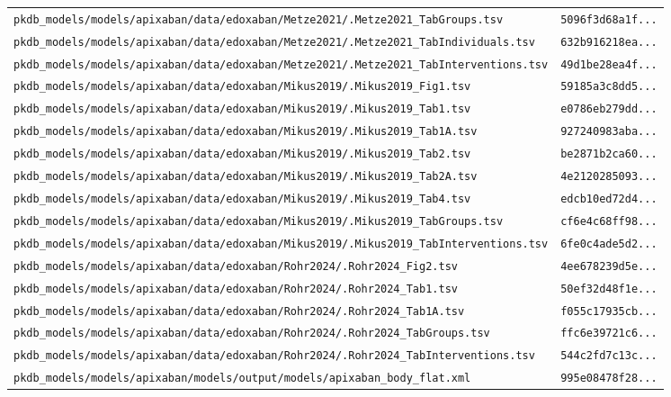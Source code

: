 \documentclass{article}
\begin{document}
\begin{longtable}{ll}
\texttt{pkdb\_models/models/apixaban/data/edoxaban/Metze2021/.Metze2021\_TabGroups.tsv} & \texttt{5096f3d68a1f...} \\
\texttt{pkdb\_models/models/apixaban/data/edoxaban/Metze2021/.Metze2021\_TabIndividuals.tsv} & \texttt{632b916218ea...} \\
\texttt{pkdb\_models/models/apixaban/data/edoxaban/Metze2021/.Metze2021\_TabInterventions.tsv} & \texttt{49d1be28ea4f...} \\
\texttt{pkdb\_models/models/apixaban/data/edoxaban/Mikus2019/.Mikus2019\_Fig1.tsv} & \texttt{59185a3c8dd5...} \\
\texttt{pkdb\_models/models/apixaban/data/edoxaban/Mikus2019/.Mikus2019\_Tab1.tsv} & \texttt{e0786eb279dd...} \\
\texttt{pkdb\_models/models/apixaban/data/edoxaban/Mikus2019/.Mikus2019\_Tab1A.tsv} & \texttt{927240983aba...} \\
\texttt{pkdb\_models/models/apixaban/data/edoxaban/Mikus2019/.Mikus2019\_Tab2.tsv} & \texttt{be2871b2ca60...} \\
\texttt{pkdb\_models/models/apixaban/data/edoxaban/Mikus2019/.Mikus2019\_Tab2A.tsv} & \texttt{4e2120285093...} \\
\texttt{pkdb\_models/models/apixaban/data/edoxaban/Mikus2019/.Mikus2019\_Tab4.tsv} & \texttt{edcb10ed72d4...} \\
\texttt{pkdb\_models/models/apixaban/data/edoxaban/Mikus2019/.Mikus2019\_TabGroups.tsv} & \texttt{cf6e4c68ff98...} \\
\texttt{pkdb\_models/models/apixaban/data/edoxaban/Mikus2019/.Mikus2019\_TabInterventions.tsv} & \texttt{6fe0c4ade5d2...} \\
\texttt{pkdb\_models/models/apixaban/data/edoxaban/Rohr2024/.Rohr2024\_Fig2.tsv} & \texttt{4ee678239d5e...} \\
\texttt{pkdb\_models/models/apixaban/data/edoxaban/Rohr2024/.Rohr2024\_Tab1.tsv} & \texttt{50ef32d48f1e...} \\
\texttt{pkdb\_models/models/apixaban/data/edoxaban/Rohr2024/.Rohr2024\_Tab1A.tsv} & \texttt{f055c17935cb...} \\
\texttt{pkdb\_models/models/apixaban/data/edoxaban/Rohr2024/.Rohr2024\_TabGroups.tsv} & \texttt{ffc6e39721c6...} \\
\texttt{pkdb\_models/models/apixaban/data/edoxaban/Rohr2024/.Rohr2024\_TabInterventions.tsv} & \texttt{544c2fd7c13c...} \\
\texttt{pkdb\_models/models/apixaban/models/output/models/apixaban\_body\_flat.xml} & \texttt{995e08478f28...} \\
\end{longtable}
\end{document}

